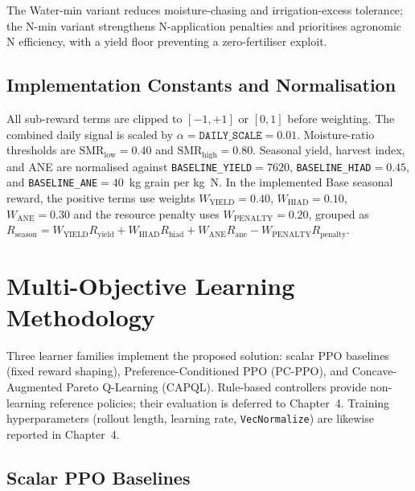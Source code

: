 The Water-min variant reduces moisture-chasing and irrigation-excess tolerance;
the N-min variant strengthens N-application penalties and prioritises agronomic
N efficiency, with a yield floor preventing a zero-fertiliser exploit.


\subsection{Implementation Constants and Normalisation}

All sub-reward terms are clipped to $[-1,+1]$ or $[0,1]$ before weighting.
The combined daily signal is scaled by $\alpha=\texttt{DAILY\_SCALE}=0.01$.
Moisture-ratio thresholds are $\mathrm{SMR}_{\text{low}}=0.40$ and
$\mathrm{SMR}_{\text{high}}=0.80$. Seasonal yield, harvest index, and ANE are
normalised against \texttt{BASELINE\_YIELD}$=7620$,
\texttt{BASELINE\_HIAD}$=0.45$, and \texttt{BASELINE\_ANE}$=40$~kg grain per
kg~N. In the implemented Base seasonal reward, the positive terms use weights
$W_{\text{YIELD}}=0.40$, $W_{\text{HIAD}}=0.10$, $W_{\text{ANE}}=0.30$ and the
resource penalty uses $W_{\text{PENALTY}}=0.20$, grouped as
$R_{\text{season}} = W_{\text{YIELD}} R_{\text{yield}} + W_{\text{HIAD}} R_{\text{hiad}}
+ W_{\text{ANE}} R_{\text{ane}} - W_{\text{PENALTY}} R_{\text{penalty}}$.


\section{Multi-Objective Learning Methodology}
\label{sec:algos}

Three learner families implement the proposed solution: scalar PPO baselines
(fixed reward shaping), Preference-Conditioned PPO (PC-PPO), and
Concave-Augmented Pareto Q-Learning (CAPQL). Rule-based controllers provide
non-learning reference policies; their evaluation is deferred to Chapter~4.
Training hyperparameters (rollout length, learning rate, \texttt{VecNormalize})
are likewise reported in Chapter~4.

\subsection{Scalar PPO Baselines}

